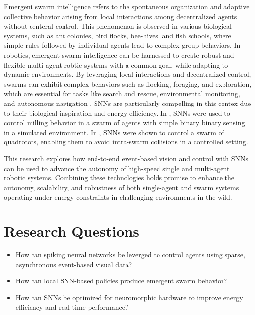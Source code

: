 \documentclass{article}
\begin{document}
Emergent swarm intelligence refers to the spontaneous organization and adaptive collective behavior arising from local interactions among decentralized agents without centeral control. This phenomenon is observed in various biological systems, such as ant colonies, bird flocks, bee-hives, and fish schools, where simple rules followed by individual agents lead to complex group behaviors. In robotics, emergent swarm intelligence can be harnessed to create robust and flexible multi-agent robtic systems with a common goal, while adapting to dynamic environments. By leveraging local interactions and decentralized control, swarms can exhibit complex behaviors such as flocking, foraging, and exploration, which are essential for tasks like search and rescue, environmental monitoring, and autonomous navigation \cite{debieSwarmRoboticsSurvey2023}. SNNs are particularly compelling in this contex due to their biological inspiration and energy efficiency. In \cite{zhuSpikingNeuralNetworks2024}, SNNs were used to control milling behavior in a swarm of agents with simple binary binary sensing in a simulated environment. In \cite{zhaoNatureinspiredSelforganizingCollision2022}, SNNs were shown to control a swarm of quadrotors, enabling them to avoid intra-swarm collisions in a controlled setting. 

This research explores how end-to-end event-based vision and control with SNNs can be used to advance the autonomy of high-speed single and multi-agent robotic systems. Combining these technologies holds promise to enhance the autonomy, scalability, and robustness of both single-agent and swarm systems operating under energy constraints in challenging environments in the wild.

\section{Research Questions}
\begin{itemize}
    \item How can spiking neural networks be leverged to control agents using sparse, asynchronous event-based visual data?
    \item How can local SNN-based policies produce emergent swarm behavior?
    \item How can SNNs be optimized for neuromorphic hardware to improve energy efficiency and real-time performance?
\end{itemize}
\end{document}
